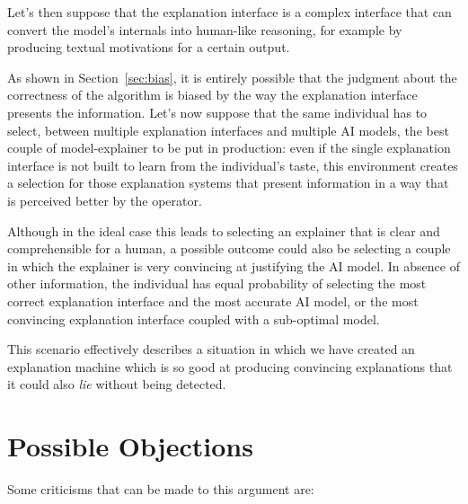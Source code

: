 \documentclass[conference]{IEEEtran}
\begin{document}
Let's then suppose that the explanation interface is a complex interface that
can convert the model's internals into human-like reasoning, for example by
producing textual motivations for a certain output.

As shown in Section~\ref{sec:bias}, it is entirely possible that the judgment
about the correctness of the algorithm is biased by the way the explanation
interface presents the information. Let's now suppose that the same individual
has to select,  between multiple explanation interfaces and multiple AI models,
the best couple of model-explainer to be put in production: even if the single
explanation interface is not built to learn from the individual's taste, this
environment creates a selection for those explanation systems that present
information in a way that is perceived better by the operator.

Although in the ideal case this leads to selecting an explainer that is clear
and comprehensible for a human, a possible outcome could also be selecting a
couple in which the explainer is very convincing at justifying the AI model. In
absence of other information, the individual has equal probability of selecting
the most correct explanation interface and the most accurate AI model, or the
most convincing explanation interface coupled with a sub-optimal model.

This scenario effectively describes a situation in which we have created an
explanation machine which is so good at producing convincing explanations that
it could also \textit{lie} without being detected.


\section{Possible Objections}
\label{sec:counterarg}

Some criticisms that can be made to this argument are:
\end{document}
